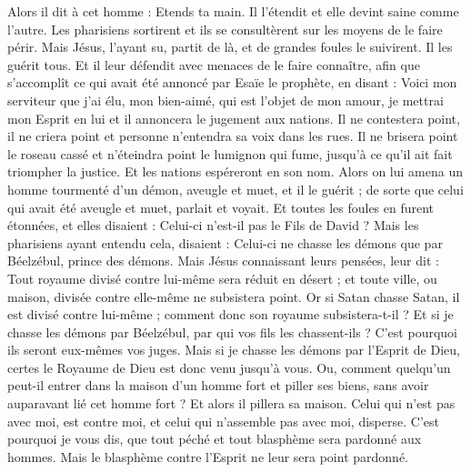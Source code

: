\begin{multicols}{2}
Alors il dit à cet homme : Etends ta main. Il l'étendit et elle devint saine comme l'autre.
Les pharisiens sortirent et ils se consultèrent sur les moyens de le faire périr.
Mais Jésus, l'ayant su, partit de là, et de grandes foules le suivirent. Il les guérit tous.
Et il leur défendit avec menaces de le faire connaître,
afin que s'accomplît ce qui avait été annoncé par Esaïe le prophète, en disant :
Voici mon serviteur que j'ai élu, mon bien-aimé, qui est l'objet de mon amour, je mettrai mon Esprit en lui et il annoncera le jugement aux nations.
Il ne contestera point, il ne criera point et personne n'entendra sa voix dans les rues.
Il ne brisera point le roseau cassé et n'éteindra point le lumignon qui fume, jusqu'à ce qu'il ait fait triompher la justice.
Et les nations espéreront en son nom.
Alors on lui amena un homme tourmenté d'un démon, aveugle et muet, et il le guérit ; de sorte que celui qui avait été aveugle et muet, parlait et voyait.
Et toutes les foules en furent étonnées, et elles disaient : Celui-ci n'est-il pas le Fils de David ?
Mais les pharisiens ayant entendu cela, disaient : Celui-ci ne chasse les démons que par Béelzébul, prince des démons.
Mais Jésus connaissant leurs pensées, leur dit : Tout royaume divisé contre lui-même sera réduit en désert ; et toute ville, ou maison, divisée contre elle-même ne subsistera point.
Or si Satan chasse Satan, il est divisé contre lui-même ; comment donc son royaume subsistera-t-il ?
Et si je chasse les démons par Béelzébul, par qui vos fils les chassent-ils ? C'est pourquoi ils seront eux-mêmes vos juges.
Mais si je chasse les démons par l'Esprit de Dieu, certes le Royaume de Dieu est donc venu jusqu'à vous.
Ou, comment quelqu'un peut-il entrer dans la maison d'un homme fort et piller ses biens, sans avoir auparavant lié cet homme fort ? Et alors il pillera sa maison.
Celui qui n'est pas avec moi, est contre moi, et celui qui n'assemble pas avec moi, disperse.
C'est pourquoi je vous dis, que tout péché et tout blasphème sera pardonné aux hommes. Mais le blasphème contre l'Esprit ne leur sera point pardonné.

\end{multicols}
